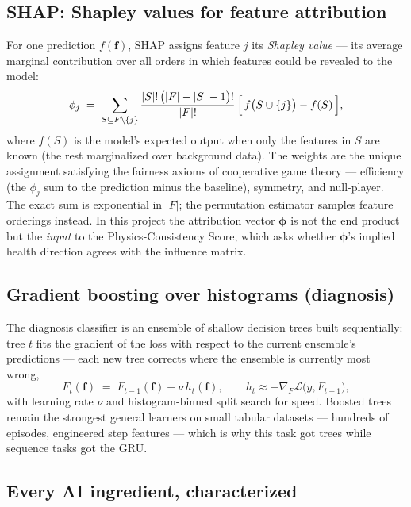 \subsection{SHAP: Shapley values for feature attribution}
\label{sec:math-shap}

For one prediction $f(\mathbf{f})$, SHAP assigns feature $j$ its \emph{Shapley value}
--- its average marginal contribution over all orders in which features could be
revealed to the model:
\begin{equation}
  \phi_j \;=\; \sum_{S \subseteq F \setminus \{j\}}
  \frac{|S|!\,\bigl(|F| - |S| - 1\bigr)!}{|F|!}\,
  \Bigl[\, f\bigl(S \cup \{j\}\bigr) - f(S) \,\Bigr],
  \label{eq:shapley}
\end{equation}
where $f(S)$ is the model's expected output when only the features in $S$ are known
(the rest marginalized over background data). The weights are the unique assignment
satisfying the fairness axioms of cooperative game theory --- efficiency (the $\phi_j$
sum to the prediction minus the baseline), symmetry, and null-player. The exact sum is
exponential in $|F|$; the permutation estimator samples feature orderings instead. In
this project the attribution vector $\boldsymbol{\phi}$ is not the end product but the
\emph{input} to the Physics-Consistency Score, which asks whether
$\boldsymbol{\phi}$'s implied health direction agrees with the influence matrix.

\subsection{Gradient boosting over histograms (diagnosis)}
\label{sec:math-gbdt}

The diagnosis classifier is an ensemble of shallow decision trees built sequentially:
tree $t$ fits the gradient of the loss with respect to the current ensemble's predictions
--- each new tree corrects where the ensemble is currently most wrong,
\begin{equation}
  F_t(\mathbf{f}) \;=\; F_{t-1}(\mathbf{f}) + \nu\, h_t(\mathbf{f}), \qquad
  h_t \approx -\nabla_{F} \mathcal{L}\bigl(y, F_{t-1}\bigr),
  \label{eq:gbdt}
\end{equation}
with learning rate $\nu$ and histogram-binned split search for speed. Boosted trees
remain the strongest general learners on small tabular datasets --- hundreds of episodes,
engineered step features --- which is why this task got trees while sequence tasks got
the GRU.

\subsection{Every AI ingredient, characterized}
\label{sec:ai-ingredients}

